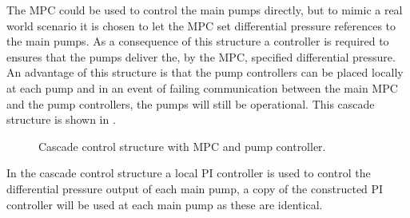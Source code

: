 The MPC could be used to control the main pumps directly, but to mimic a real world scenario it is chosen to let the MPC set differential pressure references to the main pumps. As a consequence of this structure a controller is required to ensures that the pumps deliver the, by the MPC, specified differential pressure. An advantage of this structure is that the pump controllers can be placed locally at each pump and in an event of failing communication between the main MPC and the pump controllers, the pumps will still be operational. 
This cascade structure is shown in .  
\begin{figure}[H]
\centering
 
\caption{Cascade control structure with MPC and pump controller.}
\label{fig:control_structure}
\end{figure}


In the cascade control structure a local PI controller is used to control the differential pressure output of each main pump, a copy of the constructed PI controller will be used at each main pump as these are identical.


